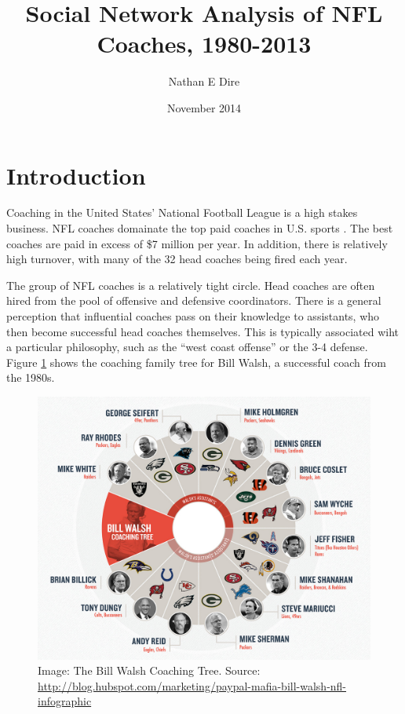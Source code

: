 \documentclass[11pt]{article}\usepackage[]{graphicx}\usepackage[]{color}
\begin{document}
\title{Social Network Analysis of NFL Coaches, 1980-2013}
\author{Nathan E Dire}
\date{November 2014}
\maketitle

\section{Introduction}

Coaching in the United States' National Football League is a high stakes
business.  NFL coaches domainate the top paid coaches in U.S. sports
\cite{forbes-pay}.  The best coaches are paid in excess of \$7 million per
year.  In addition, there is relatively high turnover, with many of the 32 head
coaches being fired each year.

The group of NFL coaches is a relatively tight circle.  Head coaches are often
hired from the pool of offensive and defensive coordinators.  There is a
general perception that influential coaches pass on their knowledge to
assistants, who then become successful head coaches themselves.  This is
typically associated wiht a particular philosophy, such as the ``west coast
offense'' or the 3-4 defense.  Figure \ref{fig-bill-walsh} shows the coaching
family tree for Bill Walsh, a successful coach from the 1980s.

\begin{figure}
\begin{center}
\includegraphics[width=\textwidth]{walsh_network.png}
\end{center}
\caption{Image: The Bill Walsh Coaching Tree. Source:
\url{http://blog.hubspot.com/marketing/paypal-mafia-bill-walsh-nfl-infographic}}
\label{fig-bill-walsh}
\end{figure}
\end{document}
